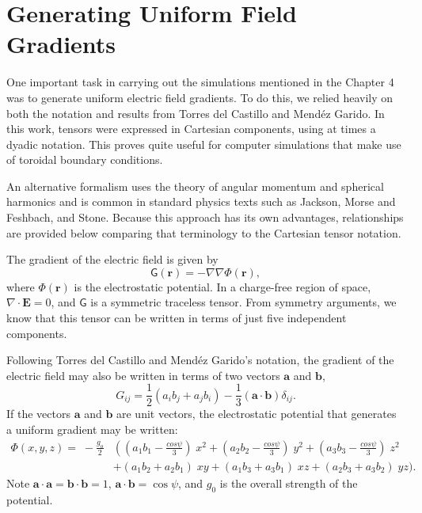 \section{Generating Uniform Field Gradients}
One important task in carrying out the simulations mentioned in the
Chapter 4 was to generate uniform electric field gradients.  To do
this, we relied heavily on both the notation and results from Torres
del Castillo and Mend\'{e}z Garido.\cite{Torres-del-Castillo:2006uo}
In this work, tensors were expressed in Cartesian components, using at
times a dyadic notation. This proves quite useful for computer
simulations that make use of toroidal boundary conditions.

An alternative formalism uses the theory of angular momentum and
spherical harmonics and is common in standard physics texts such as
Jackson,\cite{Jackson98} Morse and Feshbach,\cite{Morse:1946zr} and
Stone.\cite{Stone:1997ly} Because this approach has its own
advantages, relationships are provided below comparing that
terminology to the Cartesian tensor notation.

The gradient of the electric field is given by
\begin{equation*}
\mathsf{G}(\mathbf{r}) = -\nabla \nabla \Phi(\mathbf{r}),
\end{equation*}
where $\Phi(\mathbf{r})$ is the electrostatic potential.  In a
charge-free region of space, $\nabla \cdot \mathbf{E}=0$, and
$\mathsf{G}$ is a symmetric traceless tensor.  From symmetry
arguments, we know that this tensor can be written in terms of just
five independent components.

Following Torres del Castillo and Mend\'{e}z Garido's notation, the
gradient of the electric field may also be written in terms of two
vectors $\mathbf{a}$ and $\mathbf{b}$,
\begin{equation*}
G_{ij}=\frac{1}{2} (a_i b_j + a_j b_i) - \frac{1}{3}(\mathbf a \cdot \mathbf b) \delta_{ij} .
\end{equation*} 
If the vectors $\mathbf{a}$ and $\mathbf{b}$ are unit vectors, the
electrostatic potential that generates a uniform gradient may be
written:
\begin{align}
\Phi(x, y, z) =\; -\frac{g_o}{2} & \left(\left(a_1b_1 -
                         \frac{cos\psi}{3}\right)\;x^2+\left(a_2b_2
                         - \frac{cos\psi}{3}\right)\;y^2 +
                         \left(a_3b_3 -
                         \frac{cos\psi}{3}\right)\;z^2 \right. \nonumber \\
 & + (a_1b_2 + a_2b_1)\; xy + (a_1b_3 + a_3b_1)\; xz + (a_2b_3 + a_3b_2)\; yz \bigg) .
\label{eq:appliedPotential}
\end{align} 
Note $\mathbf{a}\cdot\mathbf{a} = \mathbf{b} \cdot \mathbf{b} = 1$,
$\mathbf{a} \cdot \mathbf{b}=\cos \psi$, and $g_0$ is the overall
strength of the potential.

